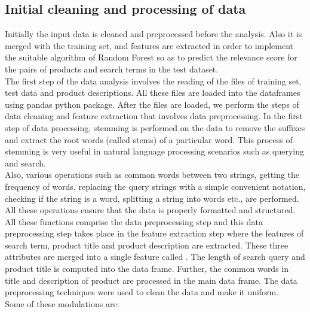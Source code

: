 \documentclass{sig-alternate-05-2015}
\begin{document}
\subsection{Initial cleaning and processing of data}
Initially the input data is cleaned and preprocessed before the analysis. Also it is merged with the training set, and features are extracted in order to implement the suitable algorithm of Random Forest so as to predict the relevance score for the pairs of products and search terms in the test dataset.\\
\newline
The first step of the data analysis involves the reading of the files of training set, test data and product descriptions. All these files are loaded into the dataframes using pandas python package. After the files are loaded, we perform the steps of data cleaning and feature extraction that involves data preprocessing. In the first step of data processing, stemming is performed on the data to remove the suffixes and extract the root words (called stems) of a particular word. This process of stemming is very useful in natural language processing scenarios such as querying and search\cite{www-stemming}.\\
Also, various operations such as common words between two strings, getting the frequency of words, replacing the query strings with a simple convenient notation, checking if the string is a word, splitting a string into words etc., are performed. All these operations ensure that the data is properly formatted and structured.  \\
All these functions comprise the data preprocessing step and this data preprocessing step takes place in the feature extraction step where the features of search term, product title and product description are extracted. These three attributes are merged into a single feature called . The length of search query and product title is computed into the data frame. Further, the common words in title and description of product are processed in the main data frame.
The data preprocessing techniques were used to clean the data and make it uniform.\\
\newline
Some of these modulations are: 
\end{document}
